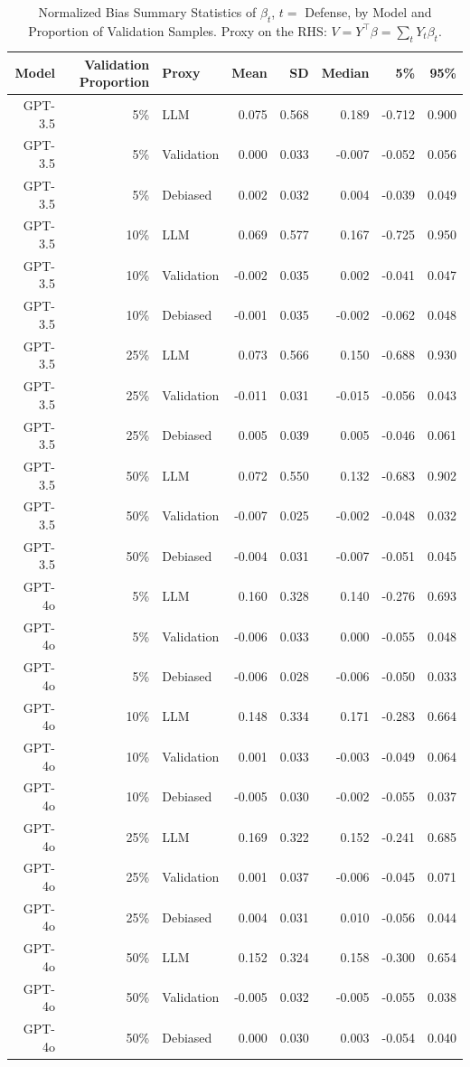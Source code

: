 \begin{table}

\caption{Normalized Bias Summary Statistics of $\beta_{t}$, $t=$ Defense, by Model and Proportion of Validation Samples. Proxy on the RHS: $V = Y^\top \beta = \sum_{t} Y_t \beta_t$.}
\centering
\begin{tabular}[t]{rrlrrrrr}
\toprule
Model & Validation Proportion & Proxy & Mean & SD & Median & 5\% & 95\%\\
\midrule
GPT-3.5 & 5\% & LLM & 0.075 & 0.568 & 0.189 & -0.712 & 0.900\\
GPT-3.5 & 5\% & Validation & 0.000 & 0.033 & -0.007 & -0.052 & 0.056\\
GPT-3.5 & 5\% & Debiased & 0.002 & 0.032 & 0.004 & -0.039 & 0.049\\
GPT-3.5 & 10\% & LLM & 0.069 & 0.577 & 0.167 & -0.725 & 0.950\\
GPT-3.5 & 10\% & Validation & -0.002 & 0.035 & 0.002 & -0.041 & 0.047\\
GPT-3.5 & 10\% & Debiased & -0.001 & 0.035 & -0.002 & -0.062 & 0.048\\
GPT-3.5 & 25\% & LLM & 0.073 & 0.566 & 0.150 & -0.688 & 0.930\\
GPT-3.5 & 25\% & Validation & -0.011 & 0.031 & -0.015 & -0.056 & 0.043\\
GPT-3.5 & 25\% & Debiased & 0.005 & 0.039 & 0.005 & -0.046 & 0.061\\
GPT-3.5 & 50\% & LLM & 0.072 & 0.550 & 0.132 & -0.683 & 0.902\\
GPT-3.5 & 50\% & Validation & -0.007 & 0.025 & -0.002 & -0.048 & 0.032\\
GPT-3.5 & 50\% & Debiased & -0.004 & 0.031 & -0.007 & -0.051 & 0.045\\
GPT-4o & 5\% & LLM & 0.160 & 0.328 & 0.140 & -0.276 & 0.693\\
GPT-4o & 5\% & Validation & -0.006 & 0.033 & 0.000 & -0.055 & 0.048\\
GPT-4o & 5\% & Debiased & -0.006 & 0.028 & -0.006 & -0.050 & 0.033\\
GPT-4o & 10\% & LLM & 0.148 & 0.334 & 0.171 & -0.283 & 0.664\\
GPT-4o & 10\% & Validation & 0.001 & 0.033 & -0.003 & -0.049 & 0.064\\
GPT-4o & 10\% & Debiased & -0.005 & 0.030 & -0.002 & -0.055 & 0.037\\
GPT-4o & 25\% & LLM & 0.169 & 0.322 & 0.152 & -0.241 & 0.685\\
GPT-4o & 25\% & Validation & 0.001 & 0.037 & -0.006 & -0.045 & 0.071\\
GPT-4o & 25\% & Debiased & 0.004 & 0.031 & 0.010 & -0.056 & 0.044\\
GPT-4o & 50\% & LLM & 0.152 & 0.324 & 0.158 & -0.300 & 0.654\\
GPT-4o & 50\% & Validation & -0.005 & 0.032 & -0.005 & -0.055 & 0.038\\
GPT-4o & 50\% & Debiased & 0.000 & 0.030 & 0.003 & -0.054 & 0.040\\
\bottomrule
\end{tabular}
\end{table}
